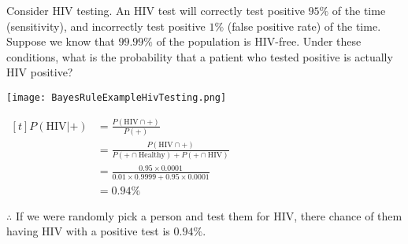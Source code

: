 \begin{example}
    Consider HIV testing. An HIV test will correctly test positive $95\%$ of the time (sensitivity), and incorrectly test positive $1\%$ (false positive rate) of the time. Suppose we know that $99.99\%$ of the population is HIV-free. Under these conditions, what is the probability that a patient who tested positive is actually HIV positive?

    \begin{minipage}[t]{0.4\linewidth}
        \begin{center} \texttt{[image: BayesRuleExampleHivTesting.png]} \end{center}
    \end{minipage}
    \begin{minipage}[t]{0.55\linewidth}
        $\begin{aligned}[t]
            P(\text{HIV} | +) & = \frac{P(\text{HIV} \cap +)}{P(+)} \\
            & = \frac{P(\text{HIV} \cap +)}{P(+ \cap \text{Healthy}) + P(+ \cap \text{HIV})} \\
            & = \frac{0.95 \times 0.0001}{0.01 \times 0.9999 + 0.95 \times 0.0001} \\
            & = 0.94\%
        \end{aligned}$
    \end{minipage}

    $\therefore$ If we were randomly pick a person and test them for HIV, there chance of them having HIV with a positive test is $0.94\%$. 
\end{example}
